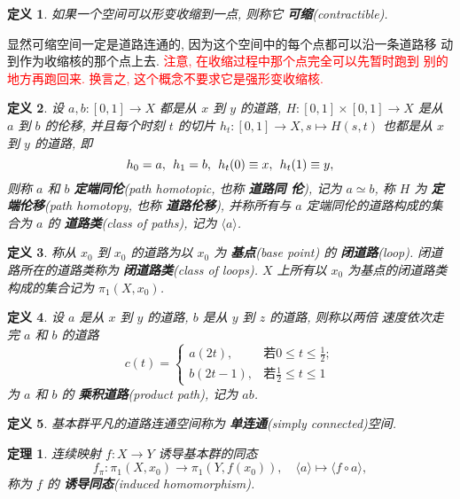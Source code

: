 \documentclass{ctexart}
\newtheorem*{thm}{定理}
\newtheorem*{defn}{定义}
\begin{document}
\begin{defn}
如果一个空间可以形变收缩到一点, 则称它 \textbf{可缩}(contractible).
\end{defn}

显然可缩空间一定是道路连通的, 因为这个空间中的每个点都可以沿一条道路移
动到作为收缩核的那个点上去. \textcolor{red}{注意, 在收缩过程中那个点完全可以先暂时跑到
别的地方再跑回来. 换言之, 这个概念不要求它是强形变收缩核.}

\begin{defn}
设 $a,b : [0,1] \to X$ 都是从 $x$ 到 $y$ 的道路, $H : [0,1] \times
[0,1] \to X$ 是从 $a$ 到 $b$ 的伦移, 并且每个时刻 $t$ 的切片 $h_t :
[0,1] \to X, s \mapsto H(s,t)$ 也都是从 $x$ 到 $y$ 的道路, 即
\[
h_0 = a, \hspace{1ex}h_1 = b,\hspace{1ex} h_t(0) \equiv x,\hspace{1ex} h_t(1) \equiv y,
\]
则称 $a$ 和 $b$ \textbf{定端同伦}(path homotopic, 也称 \textbf{道路同
  伦}), 记为 $a \simeq b$, 称 $H$ 为 \textbf{定端伦移}(path homotopy,
也称 \textbf{道路伦移}), 并称所有与 $a$ 定端同伦的道路构成的集合为 $a$
的 \textbf{道路类}(class of paths), 记为 $\langle a \rangle$.
\end{defn}

\begin{defn}
称从 $x_0$ 到 $x_0$ 的道路为以 $x_0$ 为 \textbf{基点}(base point) 的
\textbf{闭道路}(loop). 闭道路所在的道路类称为 \textbf{闭道路类}(class
of loops). $X$ 上所有以 $x_0$ 为基点的闭道路类构成的集合记为 $\pi_1(X,x_0)$.
\end{defn}

\begin{defn}
设 $a$ 是从 $x$ 到 $y$ 的道路, $b$ 是从 $y$ 到 $z$ 的道路, 则称以两倍
速度依次走完 $a$ 和 $b$ 的道路
\[
c(t) =
\begin{cases}
a(2t),     & \text{若} 0 \leq t \leq \frac{1}{2};\\
b(2t - 1), & \text{若} \frac{1}{2} \leq t \leq 1
\end{cases}
\]
为 $a$ 和 $b$ 的 \textbf{乘积道路}(product path), 记为 $ab$.
\end{defn}

\begin{defn}
基本群平凡的道路连通空间称为 \textbf{单连通}(simply connected)空间.
\end{defn}

\begin{thm}
连续映射 $f : X \to Y$ 诱导基本群的同态
\[
f_\pi : \pi_1(X,x_0) \to \pi_1(Y,f(x_0)), \hspace{1em}\langle a
\rangle \mapsto \langle f \circ a \rangle,
\]
称为 $f$ 的 \textbf{诱导同态}(induced homomorphism).
\end{thm}
\end{document}

